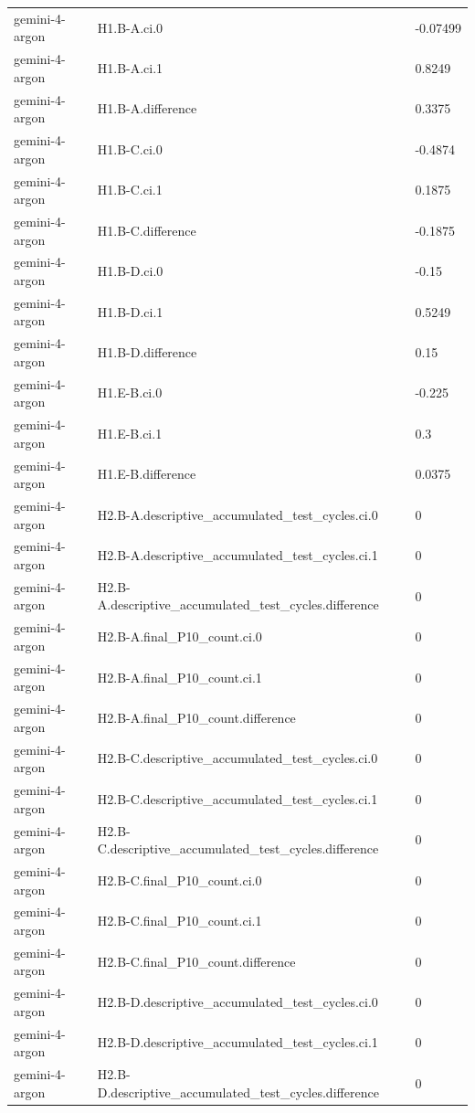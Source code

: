 \begin{tabular}{lll}
gemini-4-argon & H1.B-A.ci.0 & -0.07499 \\
gemini-4-argon & H1.B-A.ci.1 & 0.8249 \\
gemini-4-argon & H1.B-A.difference & 0.3375 \\
gemini-4-argon & H1.B-C.ci.0 & -0.4874 \\
gemini-4-argon & H1.B-C.ci.1 & 0.1875 \\
gemini-4-argon & H1.B-C.difference & -0.1875 \\
gemini-4-argon & H1.B-D.ci.0 & -0.15 \\
gemini-4-argon & H1.B-D.ci.1 & 0.5249 \\
gemini-4-argon & H1.B-D.difference & 0.15 \\
gemini-4-argon & H1.E-B.ci.0 & -0.225 \\
gemini-4-argon & H1.E-B.ci.1 & 0.3 \\
gemini-4-argon & H1.E-B.difference & 0.0375 \\
gemini-4-argon & H2.B-A.descriptive\_accumulated\_test\_cycles.ci.0 & 0 \\
gemini-4-argon & H2.B-A.descriptive\_accumulated\_test\_cycles.ci.1 & 0 \\
gemini-4-argon & H2.B-A.descriptive\_accumulated\_test\_cycles.difference & 0 \\
gemini-4-argon & H2.B-A.final\_P10\_count.ci.0 & 0 \\
gemini-4-argon & H2.B-A.final\_P10\_count.ci.1 & 0 \\
gemini-4-argon & H2.B-A.final\_P10\_count.difference & 0 \\
gemini-4-argon & H2.B-C.descriptive\_accumulated\_test\_cycles.ci.0 & 0 \\
gemini-4-argon & H2.B-C.descriptive\_accumulated\_test\_cycles.ci.1 & 0 \\
gemini-4-argon & H2.B-C.descriptive\_accumulated\_test\_cycles.difference & 0 \\
gemini-4-argon & H2.B-C.final\_P10\_count.ci.0 & 0 \\
gemini-4-argon & H2.B-C.final\_P10\_count.ci.1 & 0 \\
gemini-4-argon & H2.B-C.final\_P10\_count.difference & 0 \\
gemini-4-argon & H2.B-D.descriptive\_accumulated\_test\_cycles.ci.0 & 0 \\
gemini-4-argon & H2.B-D.descriptive\_accumulated\_test\_cycles.ci.1 & 0 \\
gemini-4-argon & H2.B-D.descriptive\_accumulated\_test\_cycles.difference & 0 \\

\end{tabular}
